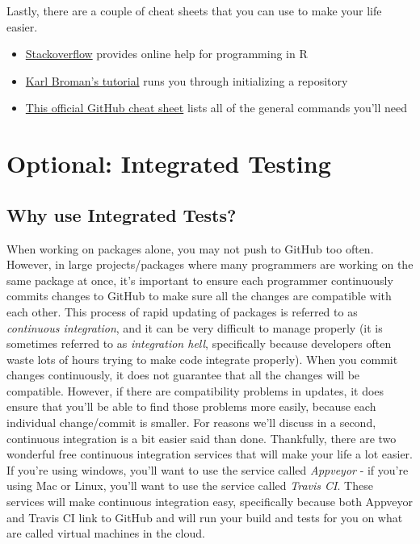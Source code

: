 \documentclass[
]{book}
\begin{document}
Lastly, there are a couple of cheat sheets that you can use to make your life easier.

\begin{itemize}
\item
  \href{https://stackoverflow.com/questions/tagged/r}{Stackoverflow} provides online help for programming in R
\item
  \href{http://kbroman.org/github_tutorial/pages/init.html}{Karl Broman's tutorial} runs you through initializing a repository
\item
  \href{https://github.github.com/training-kit/downloads/github-git-cheat-sheet.pdf}{This official GitHub cheat sheet} lists all of the general commands you'll need
\end{itemize}

\hypertarget{optional-integrated-testing}{%
\section{Optional: Integrated Testing}\label{optional-integrated-testing}}

\hypertarget{why-use-integrated-tests}{%
\subsection{Why use Integrated Tests?}\label{why-use-integrated-tests}}

When working on packages alone, you may not push to GitHub too often. However, in large projects/packages where many programmers are working on the same package at once, it's important to ensure each programmer continuously commits changes to GitHub to make sure all the changes are compatible with each other. This process of rapid updating of packages is referred to as \emph{continuous integration}, and it can be very difficult to manage properly (it is sometimes referred to as \emph{integration hell}, specifically because developers often waste lots of hours trying to make code integrate properly). When you commit changes continuously, it does not guarantee that all the changes will be compatible. However, if there are compatibility problems in updates, it does ensure that you'll be able to find those problems more easily, because each individual change/commit is smaller.
For reasons we'll discuss in a second, continuous integration is a bit easier said than done. Thankfully, there are two wonderful free continuous integration services that will make your life a lot easier. If you're using windows, you'll want to use the service called \emph{Appveyor} - if you're using Mac or Linux, you'll want to use the service called \emph{Travis CI}. These services will make continuous integration easy, specifically because both Appveyor and Travis CI link to GitHub and will run your build and tests for you on what are called virtual machines in the cloud.
\end{document}
